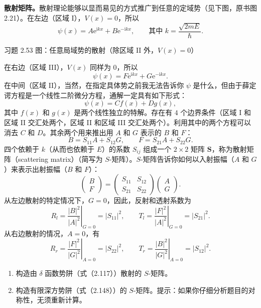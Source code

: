 \begingroup
\small
\setlength{\abovedisplayskip}{5pt}
\setlength{\belowdisplayskip}{5pt}
\textbf{散射矩阵。}散射理论能够以显而易见的方式推广到任意的定域势（见下图，原书图 2.21）。在左边（区域 I），$V(x)=0$，所以
\[
\psi(x)=A\mathrm{e}^{\mathrm{i}kx}+B\mathrm{e}^{-\mathrm{i}kx},
\qquad\text{其中 }k=\frac{\sqrt{2mE}}{\hbar}.
\]
\begin{center}

\par{\footnotesize 习题 2.53 图：任意局域势的散射（除区域 II 外，$V(x)=0$）}
\end{center}
在右边（区域 III），$V(x)$ 同样为 $0$，所以
\[
\psi(x)=F\mathrm{e}^{\mathrm{i}kx}+G\mathrm{e}^{-\mathrm{i}kx}.
\]
在中间（区域 II），当然，在指定具体势之前我无法告诉你 $\psi$ 是什么，但由于薛定谔方程是一个线性二阶微分方程，通解一定具有如下形式：
\[
\psi(x)=Cf(x)+Dg(x),
\]
其中 $f(x)$ 和 $g(x)$ 是两个线性独立的特解。存在有 $4$ 个边界条件（区域 I 和区域 II 交汇处两个，区域 II 和区域 III 交汇处两个）。利用其中的两个方程可以消去 $C$ 和 $D$。其余两个用来推出用 $A$ 和 $G$ 表示的 $B$ 和 $F$：
\[
B=S_{11}A+S_{12}G,\qquad F=S_{21}A+S_{22}G.
\]
四个依赖于 $k$（从而也依赖于 $E$）的系数 $S_{ij}$ 组成一个 $2\times2$ 矩阵 $\boldsymbol S$，称为散射矩阵（scattering matrix）（简写为 $S$-矩阵）。$S$-矩阵告诉你如何以入射振幅（$A$ 和 $G$）来表示出射振幅（$B$ 和 $F$）：
\[
\begin{pmatrix}B\\F\end{pmatrix}
=\begin{pmatrix}S_{11}&S_{12}\\S_{21}&S_{22}\end{pmatrix}
\begin{pmatrix}A\\G\end{pmatrix}.
\]
从左边散射的特定情况下，$G=0$，因此，反射和透射系数为
\[
R_l=\left.\frac{|B|^2}{|A|^2}\right|_{G=0}=|S_{11}|^2,
\qquad T_l=\left.\frac{|F|^2}{|A|^2}\right|_{G=0}=|S_{21}|^2.
\]
从右边散射的情况，$A=0$，有
\[
R_r=\left.\frac{|F|^2}{|G|^2}\right|_{A=0}=|S_{22}|^2,
\qquad T_r=\left.\frac{|B|^2}{|G|^2}\right|_{A=0}=|S_{12}|^2.
\]
\begin{enumerate}
\item 构造由 $\delta$ 函数势阱（式（2.117））散射的 $S$-矩阵。
\item 构造有限深方势阱（式（2.148））的 $S$-矩阵。提示：如果你仔细分析题目的对称性，无须重新计算。
\end{enumerate}
\endgroup
\vfill

